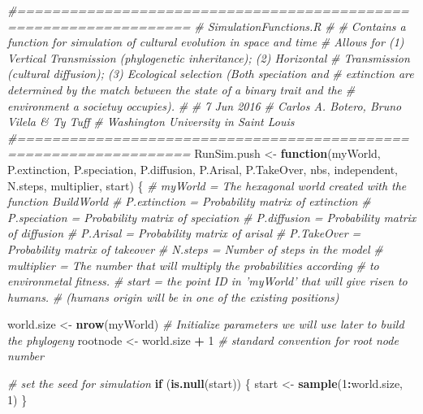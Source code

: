 \documentclass[]{book}
\newenvironment{Shaded}{\begin{snugshade}}{\end{snugshade}}
\newcommand{\KeywordTok}[1]{\textcolor[rgb]{0.13,0.29,0.53}{\textbf{{#1}}}}
\newcommand{\DecValTok}[1]{\textcolor[rgb]{0.00,0.00,0.81}{{#1}}}
\newcommand{\StringTok}[1]{\textcolor[rgb]{0.31,0.60,0.02}{{#1}}}
\newcommand{\CommentTok}[1]{\textcolor[rgb]{0.56,0.35,0.01}{\textit{{#1}}}}
\newcommand{\ControlFlowTok}[1]{\textcolor[rgb]{0.13,0.29,0.53}{\textbf{{#1}}}}
\newcommand{\OperatorTok}[1]{\textcolor[rgb]{0.81,0.36,0.00}{\textbf{{#1}}}}
\newcommand{\NormalTok}[1]{{#1}}
\theoremstyle{definition}
\theoremstyle{definition}
\theoremstyle{remark}
\begin{document}
\begin{Shaded}
\begin{Highlighting}[]
\CommentTok{#==================================================================}
\CommentTok{# SimulationFunctions.R}
\CommentTok{#}
\CommentTok{# Contains a function for simulation of cultural evolution in space and time}
\CommentTok{# Allows for (1) Vertical Transmission (phylogenetic inheritance); (2) Horizontal}
\CommentTok{# Transmission (cultural diffusion); (3) Ecological selection (Both speciation and}
\CommentTok{# extinction are determined by the match between the state of a binary trait and the}
\CommentTok{# environment a societuy occupies).}
\CommentTok{#}
\CommentTok{# 7 Jun 2016}
\CommentTok{# Carlos A. Botero, Bruno Vilela & Ty Tuff}
\CommentTok{# Washington University in Saint Louis}
\CommentTok{#==================================================================}
\NormalTok{RunSim.push <-}\StringTok{ }\ControlFlowTok{function}\NormalTok{(myWorld, P.extinction, P.speciation,}
\NormalTok{                   P.diffusion, P.Arisal, P.TakeOver, nbs, independent,}
\NormalTok{                   N.steps, multiplier, start) \{}
  \CommentTok{# myWorld = The hexagonal world created with the function BuildWorld}
  \CommentTok{# P.extinction = Probability matrix of extinction}
  \CommentTok{# P.speciation = Probability matrix of speciation}
  \CommentTok{# P.diffusion = Probability matrix of diffusion}
  \CommentTok{# P.Arisal = Probability matrix of arisal}
  \CommentTok{# P.TakeOver = Probability matrix of takeover}
  \CommentTok{# N.steps = Number of steps in the model}
  \CommentTok{# multiplier = The number that will multiply the probabilities according}
  \CommentTok{# to environmetal fitness.}
  \CommentTok{# start = the point ID in 'myWorld' that will give risen to humans.}
  \CommentTok{# (humans origin will be in one of the existing positions)}

\NormalTok{  world.size <-}\StringTok{ }\KeywordTok{nrow}\NormalTok{(myWorld)}
  \CommentTok{# Initialize parameters we will use later to build the phylogeny}
\NormalTok{  rootnode <-}\StringTok{  }\NormalTok{world.size }\OperatorTok{+}\StringTok{ }\DecValTok{1} \CommentTok{# standard convention for root node number}

  \CommentTok{# set the seed for simulation}
  \ControlFlowTok{if}\NormalTok{ (}\KeywordTok{is.null}\NormalTok{(start)) \{}
\NormalTok{    start <-}\StringTok{ }\KeywordTok{sample}\NormalTok{(}\DecValTok{1}\OperatorTok{:}\NormalTok{world.size, }\DecValTok{1}\NormalTok{)}
\NormalTok{  \}}


\end{Highlighting}
\end{Shaded}
\end{document}
